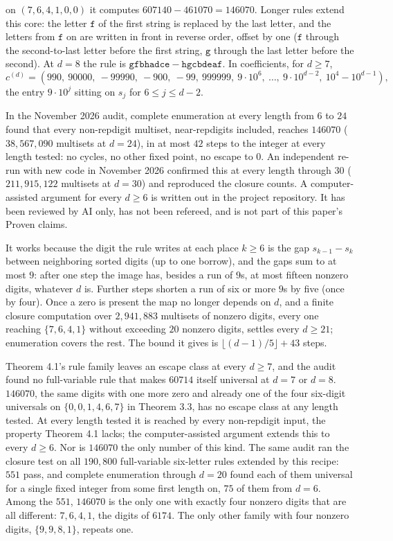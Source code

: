 \documentclass[11pt,letterpaper]{article}
\theoremstyle{paperstyle}
\theoremstyle{paperstyledef}
\theoremstyle{paperstylerem}
\begin{document}
on \((7,6,4,1,0,0)\) it computes \(607140 - 461070 = 146070\). Longer rules extend this core: the letter \(\mathtt{f}\) of the first string is replaced by the last letter, and the letters from \(\mathtt{f}\) on are written in front in reverse order, offset by one (\(\mathtt{f}\) through the second-to-last letter before the first string, \(\mathtt{g}\) through the last letter before the second). At \(d = 8\) the rule is \(\mathtt{gfbhadce} - \mathtt{hgcbdeaf}\). In coefficients, for \(d \geq 7\), \[c^{(d)} = (990,\ 90000,\ -99990,\ -900,\ -99,\ 999999,\ 9\cdot 10^{6},\ \dots,\ 9\cdot 10^{d-2},\ 10^{4} - 10^{d-1}),\] the entry \(9 \cdot 10^{j}\) sitting on \(s_j\) for \(6 \leq j \leq d-2\).

In the November 2026 audit, complete enumeration at every length from \(6\) to \(24\) found that every non-repdigit multiset, near-repdigits included, reaches \(146070\) (\(38{,}567{,}090\) multisets at \(d = 24\)), in at most \(42\) steps to the integer at every length tested: no cycles, no other fixed point, no escape to \(0\). An independent re-run with new code in November 2026 confirmed this at every length through \(30\) (\(211{,}915{,}122\) multisets at \(d = 30\)) and reproduced the closure counts. A computer-assisted argument for every \(d \geq 6\) is written out in the project repository. It has been reviewed by AI only, has not been refereed, and is not part of this paper's Proven claims.

It works because the digit the rule writes at each place \(k \geq 6\) is the gap \(s_{k-1} - s_k\) between neighboring sorted digits (up to one borrow), and the gaps sum to at most \(9\): after one step the image has, besides a run of \(9\)s, at most fifteen nonzero digits, whatever \(d\) is. Further steps shorten a run of six or more \(9\)s by five (once by four). Once a zero is present the map no longer depends on \(d\), and a finite closure computation over \(2{,}941{,}883\) multisets of nonzero digits, every one reaching \(\{7,6,4,1\}\) without exceeding \(20\) nonzero digits, settles every \(d \geq 21\); enumeration covers the rest. The bound it gives is \(\lfloor (d-1)/5 \rfloor + 43\) steps.

Theorem 4.1's rule family leaves an escape class at every \(d \geq 7\), and the audit found no full-variable rule that makes \(60714\) itself universal at \(d = 7\) or \(d = 8\). \(146070\), the same digits with one more zero and already one of the four six-digit universals on \(\{0,0,1,4,6,7\}\) in Theorem 3.3, has no escape class at any length tested. At every length tested it is reached by every non-repdigit input, the property Theorem 4.1 lacks; the computer-assisted argument extends this to every \(d \geq 6\). Nor is \(146070\) the only number of this kind. The same audit ran the closure test on all \(190{,}800\) full-variable six-letter rules extended by this recipe: \(551\) pass, and complete enumeration through \(d = 20\) found each of them universal for a single fixed integer from some first length on, \(75\) of them from \(d = 6\). Among the \(551\), \(146070\) is the only one with exactly four nonzero digits that are all different: \(7, 6, 4, 1\), the digits of \(6174\). The only other family with four nonzero digits, \(\{9, 9, 8, 1\}\), repeats one.
\end{document}
